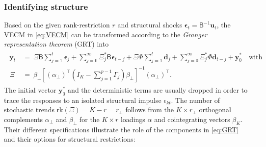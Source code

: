 \subsubsection{Identifying structure}
Based on the given rank-restriction $ r $ and structural shocks $ \boldsymbol{\epsilon}_{t} = \mathsf{B}^{-1} \boldsymbol{u}_{t} $, the VECM in \eqref{eq:VECM} can be transformed according to the \textit{Granger representation theorem} (GRT) into
\begin{align} \label{eq:GRT}
\begin{split}
	\boldsymbol{y}_{t} \ & = \ \Xi \mathsf{B} \sum_{j=1}^{t} \boldsymbol{\epsilon}_{j} + \sum_{j=0}^{\infty} \Xi^{*}_{j} \mathsf{B} \boldsymbol{\epsilon}_{t-j} + \Xi \Phi \sum_{j=1}^{t} \boldsymbol{d}_{j} + \sum_{j=0}^{\infty} \Xi^{*}_{j} \Phi \boldsymbol{d}_{t-j} + \boldsymbol{y}^{*}_{0} \quad \text{with} \\
	\Xi \ & = \ \beta_{\perp} \left[ \left( \alpha_{\perp} \right)^\top \left(I_K - \sum_{j=1}^{p-1} \Gamma_{j} \right) \beta_{\perp} \right]^{-1} \left( \alpha_{\perp} \right)^\top.
\end{split}
\end{align}
The initial vector $ \boldsymbol{y}^{*}_{0} $ and the deterministic terms are usually dropped in order to trace the responses to an isolated structural impulse $ \epsilon_{kt} $. The number of stochastic trends $\text{rk}(\Xi) = K-r = r_\perp $ follows from the $ K \times r_\perp $ orthogonal complements $ \alpha_{\perp} $ and $ \beta_{\perp} $ for the $ K \times r $ loadings $ \alpha $ and cointegrating vectors $ \beta_K $. Their different specifications illustrate the role of the components in \eqref{eq:GRT} and their options for structural restrictions:
